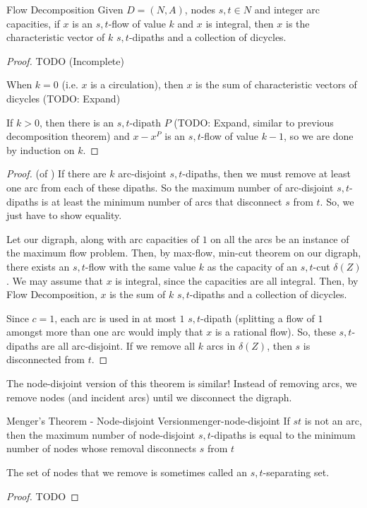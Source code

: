 \begin{proposition}{Flow Decomposition}{}
    Given $D = (N,A)$, nodes $s,t \in N$ and integer arc capacities, if $x$ is an $s,t$-flow of value $k$ and $x$ is integral, then $x$ is the characteristic vector of $k$ $s,t$-dipaths and a collection of dicycles.
\end{proposition}
\begin{proof}
    TODO (Incomplete)

    When $k = 0$ (i.e. $x$ is a circulation), then $x$ is the sum of characteristic vectors of dicycles (TODO: Expand)

    If $k > 0$, then there is an $s,t$-dipath $P$ (TODO: Expand, similar to previous decomposition theorem) and $x - x^P$ is an $s,t$-flow of value $k-1$, so we are done by induction on $k$.
\end{proof}

\begin{proof}{(of )}
    \newline
    If there are $k$ arc-disjoint $s,t$-dipaths, then we must remove at least one arc from each of these dipaths. So the maximum number of arc-disjoint $s,t$-dipaths is at least the minimum number of arcs that disconnect $s$ from $t$. So, we just have to show equality.

    Let our digraph, along with arc capacities of $1$ on all the arcs be an instance of the maximum flow problem. Then, by max-flow, min-cut theorem on our digraph, there exists an $s,t$-flow with the same value $k$ as the capacity of an $s,t$-cut $\delta(Z)$. We may assume that $x$ is integral, since the capacities are all integral. Then, by Flow Decomposition, $x$ is the sum of $k$ $s,t$-dipaths and a collection of dicycles.

    Since $c = 1$, each arc is used in at most $1$ $s,t$-dipath (splitting a flow of $1$ amongst more than one arc would imply that $x$ is a rational flow). So, these $s,t$-dipaths are all arc-disjoint. If we remove all $k$ arcs in $\delta(Z)$, then $s$ is disconnected from $t$.
\end{proof}

The node-disjoint version of this theorem is similar! Instead of removing arcs, we remove nodes (and incident arcs) until we disconnect the digraph.

\begin{theorem}{Menger's Theorem - Node-disjoint Version}{menger-node-disjoint}
    If $st$ is not an arc, then the maximum number of node-disjoint $s,t$-dipaths is equal to the minimum number of nodes whose removal disconnects $s$ from $t$
\end{theorem}
\begin{note}
    The set of nodes that we remove is sometimes called an $s,t$-separating set.
\end{note}
\begin{proof}
    TODO
\end{proof}

